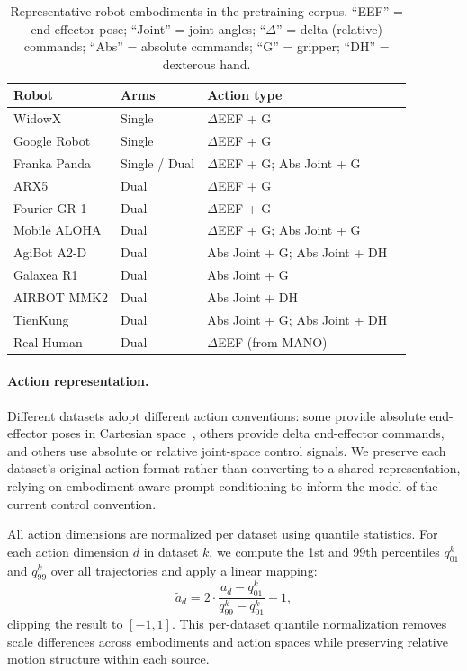 \documentclass{llmxive}
\begin{document}
\begin{table}[!htbp]
\centering
\setlength{\tabcolsep}{4pt}
\begin{tabular}{llll}
\toprule
\textbf{Robot} & \textbf{Arms} & \textbf{Action type} \\
\midrule
WidowX            & Single & $\Delta$EEF + G \\
Google Robot      & Single & $\Delta$EEF + G \\
Franka Panda      & Single / Dual & $\Delta$EEF + G;\; Abs Joint + G \\
ARX5              & Dual   & $\Delta$EEF + G \\
Fourier GR-1      & Dual   & $\Delta$EEF + G \\
Mobile ALOHA      & Dual   & $\Delta$EEF + G;\; Abs Joint + G \\
AgiBot A2-D       & Dual   & Abs Joint + G;\; Abs Joint + DH \\
Galaxea R1        & Dual   & Abs Joint + G \\
AIRBOT MMK2       & Dual   & Abs Joint + DH \\
TienKung          & Dual   & Abs Joint + G;\; Abs Joint + DH \\
Real Human        & Dual   & $\Delta$EEF (from MANO) \\
\bottomrule
\end{tabular}
\caption{Representative robot embodiments in the pretraining corpus.
``EEF'' = end-effector pose; ``Joint'' = joint angles;
``$\Delta$'' = delta (relative) commands; ``Abs'' = absolute commands;
``G'' = gripper; ``DH'' = dexterous hand.}
\label{tab:robots}
\end{table}

\paragraph{Action representation.}
Different datasets adopt different action conventions: some provide absolute
end-effector poses in Cartesian space~\citep{xie2026unifyrobotactionscamera}, others provide delta end-effector
commands, and others use absolute or relative joint-space control signals.
We preserve each dataset's original action format rather than converting to a
shared representation, relying on embodiment-aware prompt conditioning
to inform the model of the current control convention.

All action dimensions are normalized per dataset using quantile statistics.
For each action dimension $d$ in dataset $k$, we compute the 1st and 99th
percentiles $q^k_{01}$ and $q^k_{99}$ over all trajectories and apply a
linear mapping:
\begin{equation}
    \tilde{a}_d = 2 \cdot \frac{a_d - q^k_{01}}{q^k_{99} - q^k_{01}} - 1,
\end{equation}
clipping the result to $[-1, 1]$. This per-dataset quantile normalization
removes scale differences across embodiments and action spaces while preserving
relative motion structure within each source.
\end{document}
